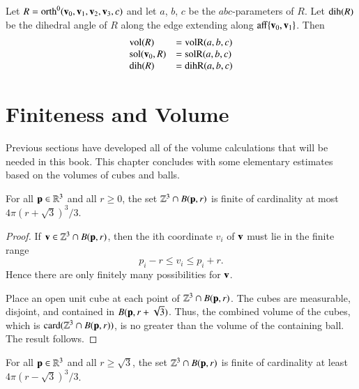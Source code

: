 \begin{lemma}\label{lemma:orth:abc} 
Let $R={\operatorname{orth}}^0({\mathbf v}_0,{\mathbf v}_1,{\mathbf v}_2,{\mathbf v}_3,c)$ and let $a$, $b$,
$c$ be the $abc$-parameters of $R$.  Let ${\operatorname{dih}}(R)$ be the dihedral
angle of $R$ along the edge extending along ${\operatorname{aff}}\{{\mathbf v}_0,{\mathbf v}_1\}$.  Then
$$
\begin{array}{lll}
{\operatorname{vol}}(R) &= {\operatorname{volR}}(a,b,c)\\
{\operatorname{sol}}({\mathbf v}_0,R) &= {\operatorname{solR}}(a,b,c)\\
{\operatorname{dih}}(R) &= {\operatorname{dihR}}(a,b,c)\\
\end{array}
$$
\end{lemma}
%
%
%
%

\section{Finiteness and Volume}

Previous sections have developed all of the volume calculations that will
be needed in this book.  This chapter concludes with some 
elementary estimates based on the volumes of  cubes and balls.

\begin{lemma}
    For all ${\mathbf p}\in\mathbb{R}^3$ and all $r\ge 0$, the set
    $\mathbb{Z}^3\cap B({\mathbf p},r)$ is finite of cardinality at most
    $4\pi (r+\sqrt3)^3/3$.
%
\end{lemma}

\begin{proof}  If ${\mathbf v}\in\mathbb{Z}^3\cap B({\mathbf p},r)$, then the ith
coordinate $v_i$ of ${\mathbf v}$ must lie in the finite range
    $$
    p_i - r \le v_i \le p_i + r.
    $$
Hence there are only finitely many possibilities for ${\mathbf v}$.


Place an open unit cube at each point of $\mathbb{Z}^3\cap B({\mathbf p},r)$.
The cubes are measurable, disjoint, and contained in
$B({\mathbf p},r+\sqrt3)$.  Thus, the combined volume of the cubes, which is
${\operatorname{card}}(\mathbb{Z}^3\cap B({\mathbf p},r))$,  is no greater than the volume of the
containing ball.  The result follows.
\end{proof}

\begin{lemma}
  For all ${\mathbf p}\in\mathbb{R}^3$ and all $r\ge\sqrt3$, the set
    $\mathbb{Z}^3\cap B({\mathbf p},r)$ is finite of cardinality at least
    $4\pi (r-\sqrt3)^3/3$.
\end{lemma}

